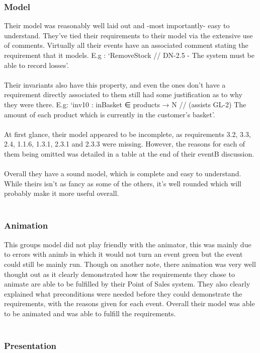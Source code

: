 \documentclass[a4paper]{article}
\begin{document}
\subsubsection{Model}
Their model was reasonably well laid out and -most importantly- easy to understand. They’ve tied their requirements to their model via the extensive use of comments. Virtually all their events have an associated comment stating the requirement that it models. E.g : ‘RemoveStock // DN-2.5 - The system must be able to record losses’. 
\\\\
Their invariants also have this property, and even the ones don’t have a requirement directly associated to them still had some justification as to why they were there. E.g: ‘inv10 : inBasket ∈ products → N //
(assists GL-2) The amount of each product which is currently in the customer’s basket’.
\\\\
At first glance, their model appeared to be incomplete, as requirements 3.2, 3.3, 2.4, 1.1.6, 1.3.1, 2.3.1 and 2.3.3 were missing. However, the reasons for each of them being omitted was detailed in a table at the end of their eventB discussion. 
\\\\
Overall they have a sound model, which is complete and easy to understand. While theirs isn’t as fancy as some of the others, it’s well rounded which will probably make it more useful overall.
\\\\
\subsubsection{Animation}
This groups model did not play friendly with the animator, this was mainly due to errors with animb in which it would not turn an event green but the event could still be mainly run. Though on another note, there animation was very well thought out as it clearly demonstrated how the requirements they chose to animate are able to be fulfilled by their Point of Sales system. 
They also clearly explained what preconditions were needed before they could demonstrate the requirements, with the reasons given for each event. 
Overall their model was able to be animated and was able to fulfill the requirements.  
\\\\
\subsubsection{Presentation}
\end{document}
